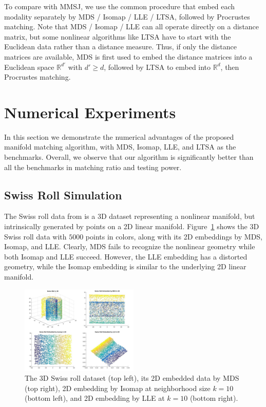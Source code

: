 \documentclass[times,twocolumn,final]{elsarticle}
\begin{document}
To compare with MMSJ, we use the common procedure that embed each modality separately by MDS / Isomap / LLE / LTSA, followed by Procrustes matching. Note that MDS / Isomap / LLE can all operate directly on a distance matrix, but some nonlinear algorithms like LTSA have to start with the Euclidean data rather than a distance measure. Thus, if only the distance matrices are available, MDS is first used to embed the distance matrices into a Euclidean space $\mathbb{R}^{d'}$ with $d' \geq d$, followed by LTSA to embed into $\mathbb{R}^{d}$, then Procrustes matching.

\section{Numerical Experiments}
\label{numer}
In this section we demonstrate the numerical advantages of the proposed manifold matching algorithm, with MDS, Isomap, LLE, and LTSA as the benchmarks. Overall, we observe that our algorithm is significantly better than all the benchmarks in matching ratio and testing power. 

\subsection{Swiss Roll Simulation}
The Swiss roll data from \citep{TenenbaumSilvaLangford2000} is a 3D dataset representing a nonlinear manifold, but intrinsically generated by points on a 2D linear manifold. Figure~\ref{fig1} shows the 3D Swiss roll data with $5000$ points in colors, along with its 2D embeddings by MDS, Isomap, and LLE. Clearly, MDS fails to recognize the nonlinear geometry while both Isomap and LLE succeed. However, the LLE embedding has a distorted geometry, while the Isomap embedding is similar to the underlying 2D linear manifold.

\begin{figure}[htbp]
\centering
\includegraphics[width=0.5\textwidth]{../Figures/Swiss}
\caption{The 3D Swiss roll dataset (top left), its 2D embedded data by MDS (top right), 2D embedding by Isomap at neighborhood size $k=10$ (bottom left), and 2D embedding by LLE at $k=10$ (bottom right).}
\label{fig1}
\end{figure}
\end{document}
